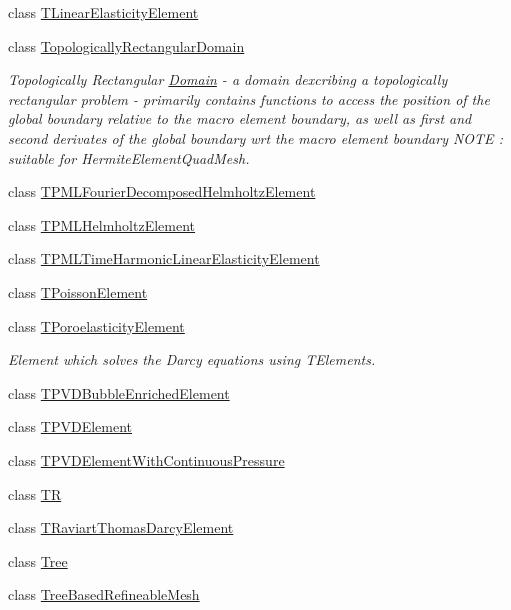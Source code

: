 \begin{DoxyCompactItemize}
class \hyperlink{classoomph_1_1TLinearElasticityElement}{T\+Linear\+Elasticity\+Element}
\item 
class \hyperlink{classoomph_1_1TopologicallyRectangularDomain}{Topologically\+Rectangular\+Domain}
\begin{DoxyCompactList}\small\item\em Topologically Rectangular \hyperlink{classoomph_1_1Domain}{Domain} -\/ a domain dexcribing a topologically rectangular problem -\/ primarily contains functions to access the position of the global boundary relative to the macro element boundary, as well as first and second derivates of the global boundary wrt the macro element boundary N\+O\+TE \+: suitable for Hermite\+Element\+Quad\+Mesh. \end{DoxyCompactList}\item 
class \hyperlink{classoomph_1_1TPMLFourierDecomposedHelmholtzElement}{T\+P\+M\+L\+Fourier\+Decomposed\+Helmholtz\+Element}
\item 
class \hyperlink{classoomph_1_1TPMLHelmholtzElement}{T\+P\+M\+L\+Helmholtz\+Element}
\item 
class \hyperlink{classoomph_1_1TPMLTimeHarmonicLinearElasticityElement}{T\+P\+M\+L\+Time\+Harmonic\+Linear\+Elasticity\+Element}
\item 
class \hyperlink{classoomph_1_1TPoissonElement}{T\+Poisson\+Element}
\item 
class \hyperlink{classoomph_1_1TPoroelasticityElement}{T\+Poroelasticity\+Element}
\begin{DoxyCompactList}\small\item\em Element which solves the Darcy equations using T\+Elements. \end{DoxyCompactList}\item 
class \hyperlink{classoomph_1_1TPVDBubbleEnrichedElement}{T\+P\+V\+D\+Bubble\+Enriched\+Element}
\item 
class \hyperlink{classoomph_1_1TPVDElement}{T\+P\+V\+D\+Element}
\item 
class \hyperlink{classoomph_1_1TPVDElementWithContinuousPressure}{T\+P\+V\+D\+Element\+With\+Continuous\+Pressure}
\item 
class \hyperlink{classoomph_1_1TR}{TR}
\item 
class \hyperlink{classoomph_1_1TRaviartThomasDarcyElement}{T\+Raviart\+Thomas\+Darcy\+Element}
\item 
class \hyperlink{classoomph_1_1Tree}{Tree}
\item 
class \hyperlink{classoomph_1_1TreeBasedRefineableMesh}{Tree\+Based\+Refineable\+Mesh}

\end{DoxyCompactItemize}
